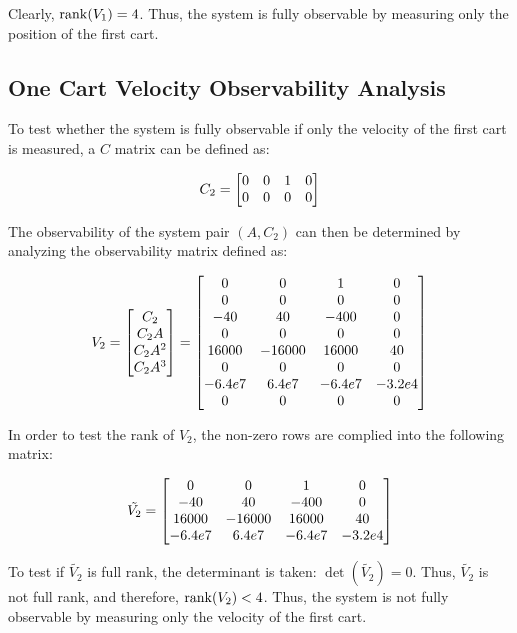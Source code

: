 \documentclass[]{article}
\begin{document}
		Clearly, $\rank(V_1) = 4$. Thus, the system is fully observable by measuring only the position of the first cart.

	\subsection{One Cart Velocity Observability Analysis}
		To test whether the system is fully observable if only the velocity of the first cart is measured, a $C$ matrix can be defined as:
		
		\begin{equation}
			C_2 = \mqty[0	&0	&1	&0\\
						0	&0	&0	&0]
		\end{equation}
		
		The observability of the system pair $(A, C_2)$ can then be determined by analyzing the observability matrix defined as:
		
		\begin{equation}
			V_2 = \mqty[C_2\\ C_2A\\ C_2A^2\\ C_2A^3]
				= \mqty[0		&0		&1		&0\\
						0		&0		&0		&0\\
						-40		&40		&-400	&0\\
						0		&0		&0		&0\\
						16000	&-16000	&16000	&40\\
						0		&0		&0		&0\\
						-6.4e7	&6.4e7	&-6.4e7	&-3.2e4\\
						0		&0		&0		&0]
		\end{equation}
		
		In order to test the rank of $V_2$, the non-zero rows are complied into the following matrix:
		
		\begin{equation}
			\tilde{V_2} = \mqty[0		&0		&1		&0\\
								-40		&40		&-400	&0\\
								16000	&-16000	&16000	&40\\
								-6.4e7	&6.4e7	&-6.4e7	&-3.2e4]
		\end{equation}
		
		To test if $\tilde{V_2}$ is full rank, the determinant is taken: $\det(\tilde{V_2}) = 0$. Thus, $\tilde{V_2}$ is not full rank, and therefore, $\rank(V_2) < 4$. Thus, the system is not fully observable by measuring only the velocity of the first cart.
			
\end{document}
